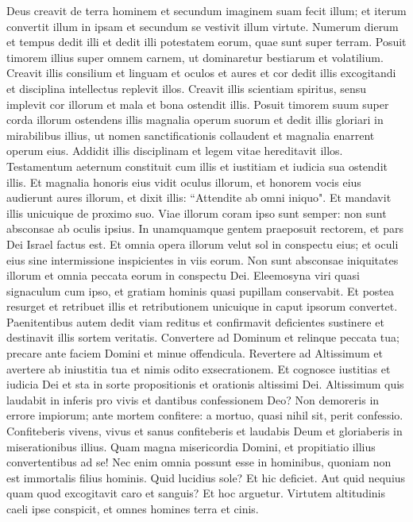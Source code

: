 \begin{biblechapter}  
\verse Deus creavit de terra hominem et secundum imaginem suam fecit illum; 
\verse et iterum convertit illum in ipsam et secundum se vestivit illum virtute. 
\verse Numerum dierum et tempus dedit illi et dedit illi potestatem eorum, quae sunt super terram. 
\verse Posuit timorem illius super omnem carnem, ut dominaretur bestiarum et volatilium. 
\verse Creavit illis consilium et linguam et oculos et aures et cor dedit illis excogitandi et disciplina intellectus replevit illos. 
\verse Creavit illis scientiam spiritus, sensu implevit cor illorum et mala et bona ostendit illis. 
\verse Posuit timorem suum super corda illorum ostendens illis magnalia operum suorum 
\verse et dedit illis gloriari in mirabilibus illius, ut nomen sanctificationis collaudent et magnalia enarrent operum eius. 
\verse Addidit illis disciplinam et legem vitae hereditavit illos. 
\verse Testamentum aeternum constituit cum illis et iustitiam et iudicia sua ostendit illis. 
\verse Et magnalia honoris eius vidit oculus illorum, et honorem vocis eius audierunt aures illorum, et dixit illis: “Attendite ab omni iniquo". 
\verse Et mandavit illis unicuique de proximo suo. 
\verse Viae illorum coram ipso sunt semper: non sunt absconsae ab oculis ipsius. 
\verse In unamquamque gentem praeposuit rectorem, 
\verse et pars Dei Israel factus est. 
\verse Et omnia opera illorum velut sol in conspectu eius; et oculi eius sine intermissione inspicientes in viis eorum. 
\verse Non sunt absconsae iniquitates illorum et omnia peccata eorum in conspectu Dei. 
\verse Eleemosyna viri quasi signaculum cum ipso, et gratiam hominis quasi pupillam conservabit. 
\verse Et postea resurget et retribuet illis et retributionem unicuique in caput ipsorum convertet. 
\verse Paenitentibus autem dedit viam reditus et confirmavit deficientes sustinere et destinavit illis sortem veritatis. 
\verse Convertere ad Dominum et relinque peccata tua; 
\verse precare ante faciem Domini et minue offendicula. 
\verse Revertere ad Altissimum et avertere ab iniustitia tua et nimis odito exsecrationem. 
\verse Et cognosce iustitias et iudicia Dei et sta in sorte propositionis et orationis altissimi Dei. 
\verse Altissimum quis laudabit in inferis pro vivis et dantibus confessionem Deo? 
\verse Non demoreris in errore impiorum; ante mortem confitere: a mortuo, quasi nihil sit, perit confessio. 
\verse Confiteberis vivens, vivus et sanus confiteberis et laudabis Deum et gloriaberis in miserationibus illius. 
\verse Quam magna misericordia Domini, et propitiatio illius convertentibus ad se! 
\verse Nec enim omnia possunt esse in hominibus, quoniam non est immortalis filius hominis. 
\verse Quid lucidius sole? Et hic deficiet. Aut quid nequius quam quod excogitavit caro et sanguis? Et hoc arguetur. 
\verse Virtutem altitudinis caeli ipse conspicit, et omnes homines terra et cinis. 
\end{biblechapter}

